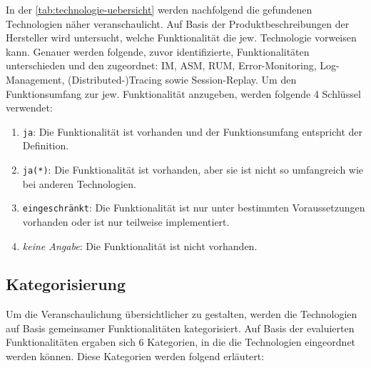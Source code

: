 In der \autoref{tab:technologie-uebersicht} werden nachfolgend die gefundenen Technologien näher veranschaulicht. Auf Basis der Produktbeschreibungen der Hersteller wird untersucht, welche Funktionalität die jew. Technologie vorweisen kann. Genauer werden folgende, zuvor identifizierte, Funktionalitäten unterschieden und den zugeordnet: IM, ASM, RUM, Error-Monitoring, Log-Management, (Distributed-)Tracing sowie Session-Replay. Um den Funktionsumfang zur jew. Funktionalität anzugeben, werden folgende 4 Schlüssel verwendet:

\begin{enumerate}
	\item \texttt{ja}: Die Funktionalität ist vorhanden und der Funktionsumfang entspricht der Definition.
	\item \texttt{ja(*)}: Die Funktionalität ist vorhanden, aber sie ist nicht so umfangreich wie bei anderen Technologien.
	\item \texttt{eingeschränkt}: Die Funktionalität ist nur unter bestimmten Voraussetzungen vorhanden oder ist nur teilweise implementiert.
	\item \textit{keine Angabe}: Die Funktionalität ist nicht vorhanden.
\end{enumerate}



\subsection{Kategorisierung}

Um die Veranschaulichung übersichtlicher zu gestalten, werden die Technologien auf Basis gemeinsamer Funktionalitäten kategorisiert. Auf Basis der evaluierten Funktionalitäten ergaben sich 6 Kategorien, in die die Technologien eingeordnet werden können. Diese Kategorien werden folgend erläutert:

\pagebreak

